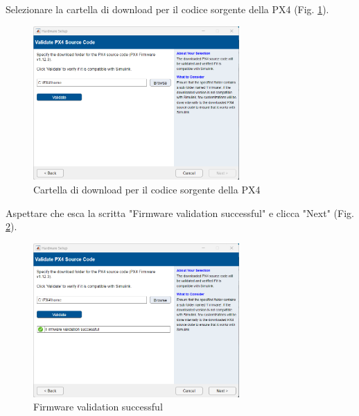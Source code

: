 \noindent
Selezionare la cartella di download per il codice sorgente della PX4 (Fig. \ref{fig:Cartella di download per il codice sorgente della PX4}).
\begin{figure}[H] %
  \centering
  \includegraphics[width=0.7\textwidth]{files/images/matlab5.png} %
  \caption{Cartella di download per il codice sorgente della PX4} %
  \label{fig:Cartella di download per il codice sorgente della PX4} %
\end{figure}
\noindent
Aspettare che esca la scritta "Firmware validation successful" e clicca "Next" (Fig. \ref{fig:Firmware validation successful}).
\begin{figure}[H] %
  \centering
  \includegraphics[width=0.7\textwidth]{files/images/matlab6.png} %
  \caption{Firmware validation successful} %
  \label{fig:Firmware validation successful} %
\end{figure}
